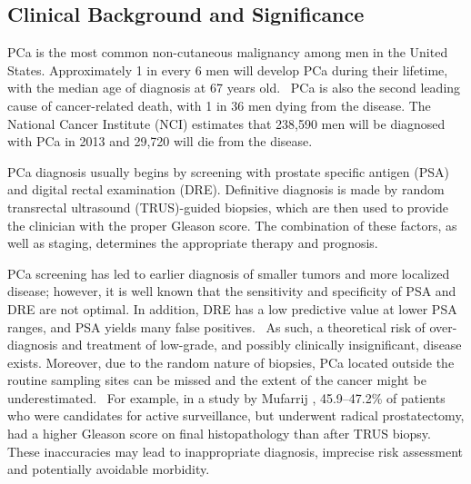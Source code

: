 ﻿\subsection{Clinical Background and Significance}
PCa is the most common non-cutaneous malignancy among men in the United States.
Approximately 1 in every 6 men will develop PCa during their lifetime, with the
median age of diagnosis at 67 years old.~\cite{Howlader2011} PCa is also the
second leading cause of cancer-related death, with 1 in 36 men dying from the
disease.  The National Cancer Institute (NCI) estimates that 238,590 men will
be diagnosed with PCa in 2013 and 29,720 will die from the
disease.~\cite{Howlader2011}

PCa diagnosis usually begins by screening with prostate specific antigen (PSA)
and digital rectal examination (DRE).  Definitive diagnosis is made by random
transrectal ultrasound (TRUS)-guided biopsies, which are then used to provide
the clinician with the proper Gleason score. The combination of these factors,
as well as staging, determines the appropriate therapy and prognosis. 

PCa screening has led to earlier diagnosis of smaller tumors and more localized
disease; however, it is well known that the sensitivity and specificity of PSA
and DRE are not optimal. In addition, DRE has a low predictive value at lower
PSA ranges, and PSA yields many false
positives.~\cite{Gosselaar2007,Gupta2013,Hricak2007} As such, a theoretical
risk of over-diagnosis and treatment of low-grade, and possibly clinically
insignificant, disease exists.  Moreover, due to the random nature of biopsies,
PCa located outside the routine sampling sites can be missed and the extent
of the cancer might be underestimated.~\cite{Gupta2013,Cornud1012} For example,
in a study by Mufarrij \etal, 45.9--47.2\% of patients who were candidates for
active surveillance, but underwent radical prostatectomy, had a higher Gleason
score on final histopathology than after TRUS biopsy.~\cite{Mufarrij2010} These
inaccuracies may lead to inappropriate diagnosis, imprecise risk assessment and
potentially avoidable morbidity.

